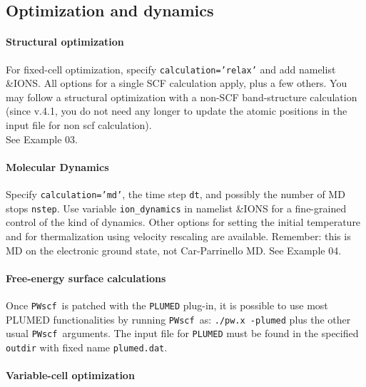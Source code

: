 \documentclass[12pt,a4paper]{article}
\def\PWscf{\texttt{PWscf}}
\begin{document}
\subsection{Optimization and dynamics}

\paragraph{Structural optimization}
For fixed-cell optimization, specify \texttt{calculation='relax'} and 
add namelist \&IONS. All options for a single SCF calculation apply, 
plus a few others. You
may follow a structural optimization with a non-SCF band-structure
calculation (since v.4.1, you do not need any longer to update the 
atomic positions in the input file for non scf calculation).\\
See Example 03.

\paragraph{Molecular Dynamics} 
Specify \texttt{calculation='md'}, the time step \texttt{dt}, and possibly the number of MD stops \texttt{nstep}.
Use variable \texttt{ion\_dynamics} in namelist \&IONS for a fine-grained control
of the kind of dynamics. Other options for setting the initial
temperature and for thermalization using velocity rescaling are
available. Remember: this is MD on the electronic ground state, not
Car-Parrinello MD.
See Example 04.

\paragraph{Free-energy surface calculations}

Once \PWscf\ is patched with the \texttt{PLUMED} plug-in, it is possible to 
use most PLUMED functionalities by running \PWscf\ as: 
\texttt{./pw.x -plumed} plus the other usual \PWscf\ arguments.
The input file for \texttt{PLUMED} must be found in the specified 
\texttt{outdir} with fixed name \texttt{plumed.dat}.

\paragraph{Variable-cell optimization}
\end{document}
